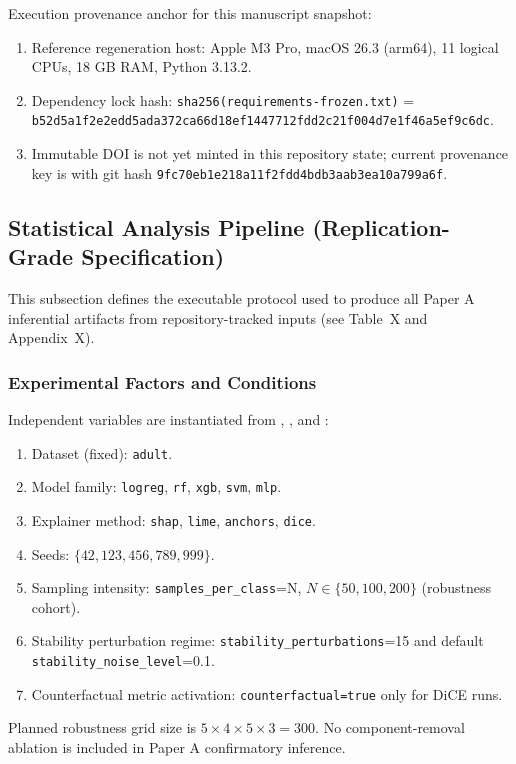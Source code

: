 \documentclass[twoside,11pt]{article}
\begin{document}
Execution provenance anchor for this manuscript snapshot:
\begin{enumerate}[leftmargin=*]
    \item Reference regeneration host: Apple M3 Pro, macOS 26.3 (arm64), 11 logical CPUs, 18 GB RAM, Python 3.13.2.
    \item Dependency lock hash: \texttt{sha256(requirements-frozen.txt)} =\\
    \texttt{b52d5a1f2e2edd5ada372ca66d18ef1447712fdd2c21f004d7e1f46a5ef9c6dc}.
    \item Immutable DOI is not yet minted in this repository state; current provenance key is  with git hash \texttt{9fc70eb1e218a11f2fdd4bdb3aab3ea10a799a6f}.
\end{enumerate}

\subsection{Statistical Analysis Pipeline (Replication-Grade Specification)}
This subsection defines the executable protocol used to produce all Paper A
inferential artifacts from repository-tracked inputs (see Table~X and Appendix~X).

\subsubsection{Experimental Factors and Conditions}
Independent variables are instantiated from
,
, and
:
\begin{enumerate}[leftmargin=*]
    \item Dataset (fixed): \texttt{adult}.
    \item Model family: \texttt{logreg}, \texttt{rf}, \texttt{xgb}, \texttt{svm}, \texttt{mlp}.
    \item Explainer method: \texttt{shap}, \texttt{lime}, \texttt{anchors}, \texttt{dice}.
    \item Seeds: $\{42,123,456,789,999\}$.
    \item Sampling intensity: \texttt{samples\_per\_class}=N, $N\in\{50,100,200\}$ (robustness cohort).
    \item Stability perturbation regime: \texttt{stability\_perturbations}=15 and default \texttt{stability\_noise\_level}=0.1.
    \item Counterfactual metric activation: \texttt{counterfactual=true} only for DiCE runs.
\end{enumerate}
Planned robustness grid size is $5\times4\times5\times3=300$. No
component-removal ablation is included in Paper A confirmatory inference.
\end{document}
